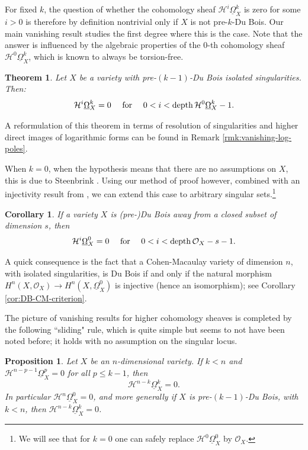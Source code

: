 \documentclass[11pt]{amsart}
\theoremstyle{definition}
\theoremstyle{plain}
\renewcommand{\H}{\mathcal H}
\renewcommand{\O}{\mathcal O}
\newcommand{\DB}{\underline{\Omega}} %
\DeclareMathOperator{\depth}{depth}
\newcounter{intro}
\newtheorem{intro-corollary}[intro]{Corollary}
\newtheorem{intro-theorem}[intro]{Theorem}
\newtheorem{intro-proposition}[intro]{Proposition}
\begin{document}
For fixed $k$, the question of whether the cohomology sheaf $\H^i \DB_X^k$ is zero for some $i > 0$ is therefore by definition nontrivial only if 
$X$ is not pre-$k$-Du Bois. Our main vanishing result studies the first degree where this is the case. Note that the answer is influenced by the algebraic properties
of the $0$-th cohomology sheaf $\H^0\DB^k_X$, which is known to always be torsion-free.


\begin{intro-theorem}\label{thm:vanishing-isolated}
 Let $X$ be a variety with pre-$(k-1)$-Du Bois isolated singularities. Then:
 \[\H^i\DB^k_X = 0 \quad \text{ {\rm for} } \quad 0<i<\depth\H^0\DB^k_X -1.\] 
\end{intro-theorem}

A reformulation of this theorem in terms of resolution of singularities and higher direct images of logarithmic forms can be found in Remark \ref{rmk:vanishing-log-poles}.

When $k = 0$, when the hypothesis means that there are no assumptions on $X$, this is due to Steenbrink \cite[Proposition 1]{Steenbrink-DB-invariants}. Using our method of proof however, combined with an injectivity result from \cite{KS-injectivity}, we can extend this case to arbitrary singular sets.\footnote{We will see that for $k = 0$ one can safely replace $\H^0 \DB_X^0$ by $\O_X$.}

\begin{intro-corollary}\label{cor:CM}
If a variety $X$ is (pre-)Du Bois away from a closed subset of dimension $s$, then 
    \[\H^i\DB^0_X = 0 \quad \text{ {\rm for} } \quad 0<i<\depth \O_X- s -1.\]
\end{intro-corollary}

A quick consequence is the fact that a Cohen-Macaulay variety of dimension $n$, with isolated singularities, is Du Bois if and only if the natural morphism 
$H^n (X, \O_X ) \to H^n (X, \DB_X^0)$ is injective (hence an isomorphism); see Corollary \ref{cor:DB-CM-criterion}.

The picture of vanishing results for higher cohomology sheaves is completed by the following ``sliding" rule, which is quite simple but seems to not have been noted before; it holds with no assumption on the singular locus.

\begin{intro-proposition}\label{prop:borderline-vanishing}
Let $X$ be an $n$-dimensional variety. If $k < n$ and $\H^{n-p -1}\DB_X^p=0$ for all $p \le k -1$, then 
\[\H^{n-k}\DB_X^k=0.\]
In particular $\H^n \DB_X^0 = 0$, and more generally if $X$ is pre-$(k-1)$-Du Bois, with $k < n$, then $\H^{n-k}\DB_X^k=0$.
\end{intro-proposition}
\end{document}
